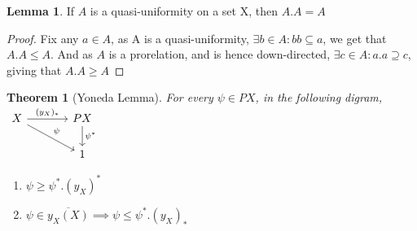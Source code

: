 \documentclass[18pt,a4paper]{article}
\newtheorem{theorem}{Theorem}[section]
\theoremstyle{definition}
\newtheorem{lemma}{Lemma}[definition]
\begin{document}
\begin{lemma} If $A$ is a quasi-uniformity on a set X, then $A.A=A$
\end{lemma}
\begin{proof}
		Fix any $a \in A$, as A is a quasi-uniformity, $\exists b \in A: bb \subseteq a$,
		we get that $A.A \leq A$. And as $A$ is a prorelation, and is hence down-directed,
		$\exists c \in A : a.a \supseteq c$, giving that $A.A \geq A$
\end{proof}

\begin{theorem}[Yoneda Lemma] %
For every $\psi \in PX$, in the following digram,
$\begin{tikzcd}[column sep=large ]
	X \arrow{r}{(y_X)_*}  \arrow{rd}{\psi}
  & PX \arrow{d}{\psi^*} \\
    & 1
\end{tikzcd}$
\begin{enumerate}[label=(\alph*)]
		\item $\psi \geq \psi^*.(y_X)^*$
		\item $\psi \in \overline{y_X(X)} \implies \psi \leq \psi^*.(y_X)_*$
	\end{enumerate}
\end{theorem}
\end{document}
